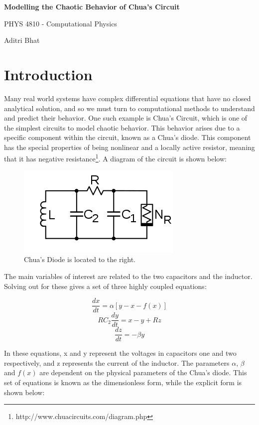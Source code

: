 \documentclass{article}
\begin{document}
\begin{center}
    \huge
    \textbf{Modelling the Chaotic Behavior of Chua's Circuit}

    \vspace{0.3cm}    
    \large
    PHYS 4810 - Computational Physics
    
    \vspace{0.2cm}
    \large
    Aditri Bhat
\end{center}


\section{Introduction}
    Many real world systems have complex differential equations that have no closed analytical solution, and so we must turn to computational methods to understand and predict their behavior. One such example is Chua's Circuit, which is one of the simplest circuits to model chaotic behavior. This behavior arises due to a specific component within the circuit, known as a Chua's diode. This component has the special properties of being nonlinear and a locally active resistor, meaning that it has negative resistance\footnote{ http://www.chuacircuits.com/diagram.php}. A diagram of the circuit is shown below:
    
    \begin{figure}[h]
        \centering
        \includegraphics[scale = 0.6]{Images/chua_circuit.png}
        \caption{Chua's Diode is located to the right.}
        \label{fig:my_label}
    \end{figure}
    
    The main variables of interest are related to the two capacitors and the inductor. Solving out for these gives a set of three highly coupled equations:
    
    $$\frac{dx}{dt} = \alpha[y - x - f(x)]$$
    $$RC_2\frac{dy}{dt} = x - y + Rz$$
    $$\frac{dz}{dt} = -\beta y$$
    
    In these equations, x and y represent the voltages in capacitors one and two respectively, and z represents the current of the inductor. The parameters $\alpha$, $\beta$ and $f(x)$ are dependent on the physical parameters of the Chua's diode. This set of equations is known as the dimensionless form, while the explicit form is shown below:
    
\end{document}
